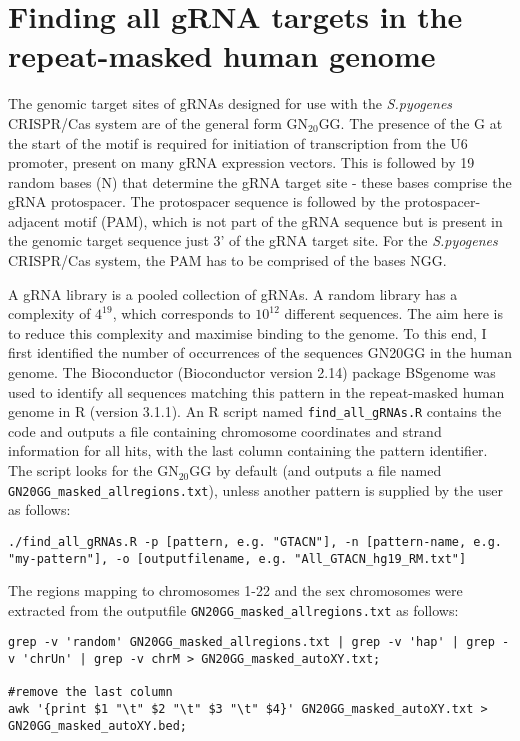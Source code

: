 \section{Finding all gRNA targets in the repeat-masked human genome}
\label{sec:GN20GG in genome}

The genomic target sites of gRNAs designed for use with the \textit{S.pyogenes} CRISPR/Cas system are of the general form GN$_{20}$GG. The presence of the G at the start of the motif is required for initiation of transcription from the U6 promoter, present on many gRNA expression vectors. This is followed by 19 random bases (N) that determine the gRNA target site - these bases comprise the gRNA protospacer. The protospacer sequence is followed by the protospacer-adjacent motif (PAM), which is not part of the gRNA sequence but is present in the genomic target sequence just 3' of the gRNA target site. For the \textit{S.pyogenes} CRISPR/Cas system, the PAM has to be comprised of the bases NGG. 

A gRNA library is a pooled collection of gRNAs. A random library has a complexity of $4^{19}$, which corresponds to $10^{12}$ different sequences. The aim here is to reduce this complexity and maximise binding to the genome. To this end, I first identified the number of occurrences of the sequences GN20GG in the human genome. The Bioconductor (Bioconductor version 2.14) package BSgenome \citep{BSgenome} was used to identify all sequences matching this pattern in the repeat-masked human genome in R (version 3.1.1). An R script named \verb|find_all_gRNAs.R| contains the code and outputs a file containing chromosome coordinates and strand information for all hits, with the last column containing the pattern identifier. The script looks for the GN$_{20}$GG by default (and outputs a file named \verb|GN20GG_masked_allregions.txt|), unless another pattern is supplied by the user as follows:

\begin{small}\begin{lstlisting}
./find_all_gRNAs.R -p [pattern, e.g. "GTACN"], -n [pattern-name, e.g. "my-pattern"], -o [outputfilename, e.g. "All_GTACN_hg19_RM.txt"]
\end{lstlisting}\end{small}

The regions mapping to chromosomes 1-22 and the sex chromosomes were extracted from the outputfile \verb|GN20GG_masked_allregions.txt| as follows:

\begin{small}\begin{lstlisting}
grep -v 'random' GN20GG_masked_allregions.txt | grep -v 'hap' | grep -v 'chrUn' | grep -v chrM > GN20GG_masked_autoXY.txt;

#remove the last column
awk '{print $1 "\t" $2 "\t" $3 "\t" $4}' GN20GG_masked_autoXY.txt > GN20GG_masked_autoXY.bed;
\end{lstlisting}\end{small}

